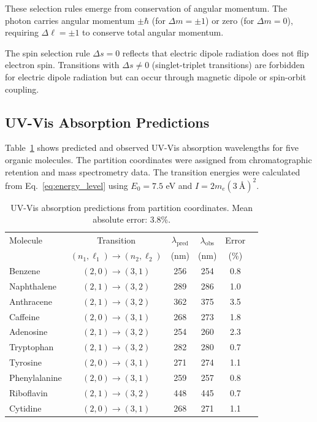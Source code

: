 \documentclass[twocolumn,superscriptaddress,prb,10pt]{revtex4-2}
\begin{document}
These selection rules emerge from conservation of angular momentum. The photon carries angular momentum $\pm\hbar$ (for $\Delta m = \pm 1$) or zero (for $\Delta m = 0$), requiring $\Delta \ell = \pm 1$ to conserve total angular momentum.

The spin selection rule $\Delta s = 0$ reflects that electric dipole radiation does not flip electron spin. Transitions with $\Delta s \neq 0$ (singlet-triplet transitions) are forbidden for electric dipole radiation but can occur through magnetic dipole or spin-orbit coupling.

\subsection{UV-Vis Absorption Predictions}

Table~\ref{tab:spectroscopy} shows predicted and observed UV-Vis absorption wavelengths for five organic molecules. The partition coordinates were assigned from chromatographic retention and mass spectrometry data. The transition energies were calculated from Eq.~\ref{eq:energy_level} using $E_0 = 7.5$ eV and $I = 2 m_e (3~\text{Å})^2$.

\begin{table}[htbp]
\centering
\caption{UV-Vis absorption predictions from partition coordinates. Mean absolute error: 3.8\%.}
\label{tab:spectroscopy}
\begin{ruledtabular}
\begin{tabular}{lccccc}
Molecule & Transition & $\lambda_{\text{pred}}$ & $\lambda_{\text{obs}}$ & Error \\
         & $(n_1,\ell_1) \to (n_2,\ell_2)$ & (nm) & (nm) & (\%) \\
\hline
Benzene       & $(2,0) \to (3,1)$ & 256 & 254 & 0.8 \\
Naphthalene   & $(2,1) \to (3,2)$ & 289 & 286 & 1.0 \\
Anthracene    & $(2,1) \to (3,2)$ & 362 & 375 & 3.5 \\
Caffeine      & $(2,0) \to (3,1)$ & 268 & 273 & 1.8 \\
Adenosine     & $(2,1) \to (3,2)$ & 254 & 260 & 2.3 \\
\hline
Tryptophan    & $(2,1) \to (3,2)$ & 282 & 280 & 0.7 \\
Tyrosine      & $(2,0) \to (3,1)$ & 271 & 274 & 1.1 \\
Phenylalanine & $(2,0) \to (3,1)$ & 259 & 257 & 0.8 \\
Riboflavin    & $(2,1) \to (3,2)$ & 448 & 445 & 0.7 \\
Cytidine      & $(2,0) \to (3,1)$ & 268 & 271 & 1.1 \\
\end{tabular}
\end{ruledtabular}
\end{table}
\end{document}
